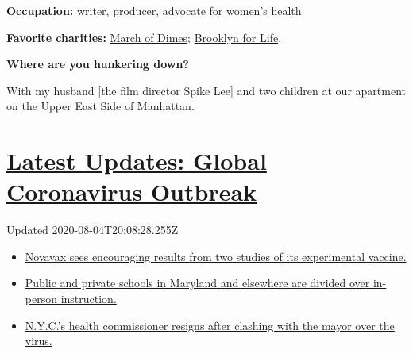\textbf{Occupation:} writer, producer, advocate for women's health

\textbf{Favorite charities:}
\href{https://www.marchofdimes.org/giving/support-general.aspx?\&utm_source=google\&utm_medium=cpc\&utm_campaign=alwayson\&utm_content=nonbrand\&utm_term=march\%20of\%20dimes\%20website\&DonationTrackingParam1=alwayson_google\&gclid=EAIaIQobChMI7oXbnKXF6QIVA4vICh1rKA6bEAAYASAAEgJDSPD_BwE\&gclsrc=aw.ds}{March
of Dimes}; \href{https://www.brooklynforlife.org}{Brooklyn for Life}.

\textbf{Where are you hunkering down?}

With my husband {[}the film director Spike Lee{]} and two children at
our apartment on the Upper East Side of Manhattan.

\hypertarget{latest-updates-global-coronavirus-outbreak}{%
\section{\texorpdfstring{\href{https://www.nytimes.com/2020/08/04/world/coronavirus-cases.html?action=click\&pgtype=Article\&state=default\&region=MAIN_CONTENT_1\&context=storylines_live_updates}{Latest
Updates: Global Coronavirus
Outbreak}}{Latest Updates: Global Coronavirus Outbreak}}\label{latest-updates-global-coronavirus-outbreak}}

Updated 2020-08-04T20:08:28.255Z

\begin{itemize}
\tightlist
\item
  \href{https://www.nytimes.com/2020/08/04/world/coronavirus-cases.html?action=click\&pgtype=Article\&state=default\&region=MAIN_CONTENT_1\&context=storylines_live_updates\#link-1228a480}{Novavax
  sees encouraging results from two studies of its experimental
  vaccine.}
\item
  \href{https://www.nytimes.com/2020/08/04/world/coronavirus-cases.html?action=click\&pgtype=Article\&state=default\&region=MAIN_CONTENT_1\&context=storylines_live_updates\#link-4825b93}{Public
  and private schools in Maryland and elsewhere are divided over
  in-person instruction.}
\item
  \href{https://www.nytimes.com/2020/08/04/world/coronavirus-cases.html?action=click\&pgtype=Article\&state=default\&region=MAIN_CONTENT_1\&context=storylines_live_updates\#link-4d1eafa8}{N.Y.C.'s
  health commissioner resigns after clashing with the mayor over the
  virus.}
\end{itemize}

